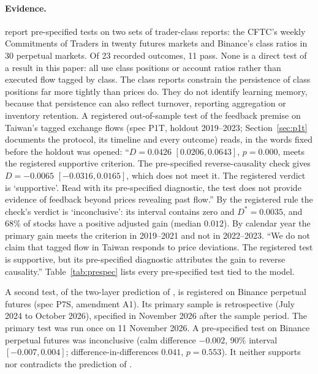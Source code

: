 \documentclass[12pt]{article}
\theoremstyle{definition}
\theoremstyle{remark}
\begin{document}
\paragraph{Evidence.} \citet{niroula2026a} report pre-specified tests on two sets of trader-class reports: the CFTC's weekly Commitments of Traders in twenty futures markets and Binance's class ratios in 30 perpetual markets. Of 23 recorded outcomes, 11 pass. None is a direct test of a result in this paper: all use class positions or account ratios rather than executed flow tagged by class. The class reports constrain the persistence of class positions far more tightly than prices do. They do not identify learning memory, because that persistence can also reflect turnover, reporting aggregation or inventory retention. A registered out-of-sample test of the feedback premise on Taiwan's tagged exchange flows (spec P1T, holdout 2019--2023; Section~\ref{sec:p1t} documents the protocol, its timeline and every outcome) reads, in the words fixed before the holdout was opened: ``$D = 0.0426$ $[0.0206, 0.0643]$, $p = 0.000$, meets the registered supportive criterion. The pre-specified reverse-causality check gives $D = -0.0065$ $[-0.0316, 0.0165]$, which does not meet it. The registered verdict is `supportive'. Read with its pre-specified diagnostic, the test does not provide evidence of feedback beyond prices revealing past flow.'' By the registered rule the check's verdict is `inconclusive': its interval contains zero and $D^* = 0.0035$, and $68\%$ of stocks have a positive adjusted gain (median $0.012$). By calendar year the primary gain meets the criterion in 2019--2021 and not in 2022--2023. ``We do not claim that tagged flow in Taiwan responds to price deviations. The registered test is supportive, but its pre-specified diagnostic attributes the gain to reverse causality.'' Table~\ref{tab:prespec} lists every pre-specified test tied to the model.

A second test, of the two-layer prediction of \citet[their Section~S6]{niroula2026full}, is registered on Binance perpetual futures (spec P7S, amendment A1). Its primary sample is retrospective (July 2024 to October 2026), specified in November 2026 after the sample period. The primary test was run once on 11 November 2026. A pre-specified test on Binance perpetual futures was inconclusive (calm difference $-0.002$, 90\% interval $[-0.007, 0.004]$; difference-in-differences $0.041$, $p=0.553$). It neither supports nor contradicts the prediction of \citet[their Section~S6]{niroula2026full}.
\end{document}
